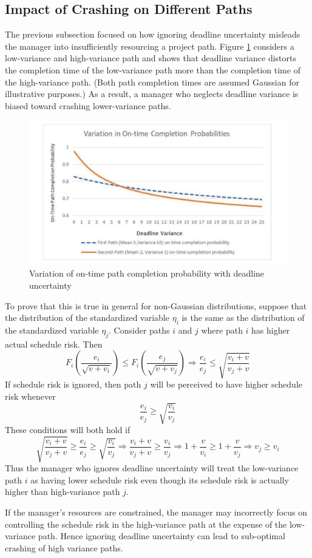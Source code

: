 \documentclass[11pt]{article}
\begin{document}
\subsection{Impact of Crashing on Different Paths}
The previous subsection focused on how ignoring deadline uncertainty misleads the manager into insufficiently resourcing a project path.  Figure \ref{fig:p_vary_uncertainty} considers a low-variance and high-variance path and shows that  deadline variance distorts the completion time of the low-variance path more than the completion time of the high-variance path.  (Both path completion times are assumed Gaussian for illustrative purposes.)   As a result, a manager who neglects deadline variance is biased toward crashing lower-variance paths.  
 \begin{figure}[ht]
\begin{center}
\includegraphics[scale=0.30]{uncertaindeadlinespath.pdf}
\caption{Variation of on-time path completion probability with deadline uncertainty}
\label{fig:p_vary_uncertainty}
\end{center}
\end{figure}
To prove that this is true in general for non-Gaussian distributions, suppose that the distribution of the standardized variable $\eta_i$ is the same as the distribution of the standardized variable $\eta_j$.   Consider paths $i$ and $j$ where path $i$ has higher actual schedule risk. Then
$$F_i(\frac{e_i}{\sqrt{v+v_i}}) \leq F_i (\frac{e_j}{\sqrt{v+v_j}}) \Longrightarrow \frac{e_i}{e_j} \leq \sqrt{\frac{v_i+v}{v_j+v}} $$
If schedule risk is ignored, then path $j$ will be perceived to have higher schedule risk whenever
$$\frac{e_i}{e_j} \geq \sqrt{\frac{v_i}{v_j}} $$
These conditions will both hold if
$$ \sqrt{\frac{v_i+v}{v_j+v}} \geq \frac{e_i}{e_j} \geq \sqrt{\frac{v_i}{v_j}} \Longrightarrow \frac{v_i+v}{v_j+v} \geq \frac{v_i}{v_j} \Longrightarrow 1+\frac{v}{v_i} \geq 1 + \frac{v}{v_j} \Longrightarrow v_j \geq v_i $$
Thus the manager who ignores deadline uncertainty will treat the low-variance path $i$ as having lower schedule risk even though its schedule risk is actually higher than high-variance path $j$. \par  If the manager's resources are constrained, the manager may incorrectly focus on controlling the schedule risk in the high-variance path at the expense of the low-variance path. Hence ignoring deadline uncertainty can lead to sub-optimal crashing of high variance paths. 
\end{document}
